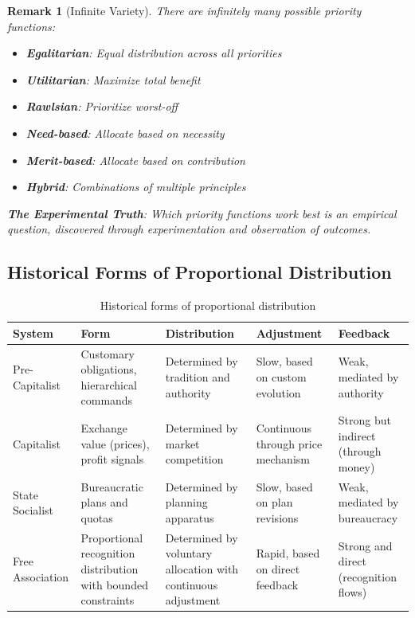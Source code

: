 \documentclass[11pt]{article}
\newtheorem{remark}{Remark}
\begin{document}
\begin{remark}[Infinite Variety]
There are infinitely many possible priority functions:
\begin{itemize}
\item \textbf{Egalitarian}: Equal distribution across all priorities
\item \textbf{Utilitarian}: Maximize total benefit
\item \textbf{Rawlsian}: Prioritize worst-off
\item \textbf{Need-based}: Allocate based on necessity
\item \textbf{Merit-based}: Allocate based on contribution
\item \textbf{Hybrid}: Combinations of multiple principles
\end{itemize}

\textbf{The Experimental Truth}: Which priority functions work best is an empirical question, discovered through experimentation and observation of outcomes.
\end{remark}

\subsection{Historical Forms of Proportional Distribution}

\begin{table}[h]
\centering
\begin{tabular}{|l|p{3cm}|p{3cm}|p{2.5cm}|p{2.5cm}|}
\hline
\textbf{System} & \textbf{Form} & \textbf{Distribution} & \textbf{Adjustment} & \textbf{Feedback} \\
\hline
Pre-Capitalist & Customary obligations, hierarchical commands & Determined by tradition and authority & Slow, based on custom evolution & Weak, mediated by authority \\
\hline
Capitalist & Exchange value (prices), profit signals & Determined by market competition & Continuous through price mechanism & Strong but indirect (through money) \\
\hline
State Socialist & Bureaucratic plans and quotas & Determined by planning apparatus & Slow, based on plan revisions & Weak, mediated by bureaucracy \\
\hline
Free Association & Proportional recognition distribution with bounded constraints & Determined by voluntary allocation with continuous adjustment & Rapid, based on direct feedback & Strong and direct (recognition flows) \\
\hline
\end{tabular}
\caption{Historical forms of proportional distribution}
\end{table}
\end{document}
